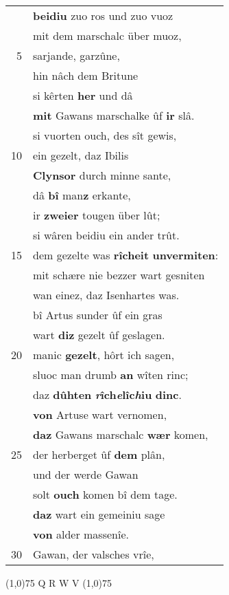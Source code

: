 \documentclass[8pt,a4paper,notitlepage]{article}
\begin{document}
\begin{table}[ht]
\begin{minipage}[t]{0.5\linewidth}
\begin{tabular}{rl}
 & \textbf{beidiu} zuo ros und zuo vuoz\\ 
 & mit dem marschalc über muoz,\\ 
5 & sarjande, garzûne,\\ 
 & hin nâch dem Britune\\ 
 & si kêrten \textbf{her} und dâ\\ 
 & \textbf{mit} Gawans marschalke ûf \textbf{ir} slâ.\\ 
 & si vuorten ouch, des sît gewis,\\ 
10 & ein gezelt, daz Ibilis\\ 
 & \textbf{Clynsor} durch minne sante,\\ 
 & dâ \textbf{bî} man\textbf{z} erkante,\\ 
 & ir \textbf{zweier} tougen über lût;\\ 
 & si wâren beidiu ein ander trût.\\ 
15 & dem gezelte was \textbf{rîcheit} \textbf{unvermiten}:\\ 
 & mit schære nie bezzer wart gesniten\\ 
 & wan einez, daz Isenhartes was.\\ 
 & bî Artus sunder ûf ein gras\\ 
 & wart \textbf{diz} gezelt ûf geslagen.\\ 
20 & manic \textbf{gezelt}, hôrt ich sagen,\\ 
 & sluoc man drumb \textbf{an} wîten rinc;\\ 
 & daz \textbf{dûhten} \textbf{\textit{r}îch\textit{e}lîc\textit{h}iu} \textbf{dinc}.\\ 
 & \textbf{von} Artuse wart vernomen,\\ 
 & \textbf{daz} Gawans marschalc \textbf{wær} komen,\\ 
25 & der herberget ûf \textbf{dem} plân,\\ 
 & und der werde Gawan\\ 
 & solt \textbf{ouch} komen bî dem tage.\\ 
 & \textbf{daz} wart ein gemeiniu sage\\ 
 & \textbf{von} alder massenîe.\\ 
30 & Gawan, der valsches vrîe,\\ 
\end{tabular}
\scriptsize
\line(1,0){75} \newline
Q R W V \newline
\line(1,0){75} \newline
\newline

\end{minipage}
\end{table}
\end{document}
